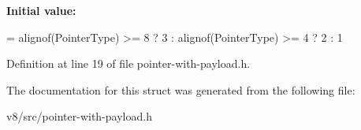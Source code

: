 {\bfseries Initial value\+:}
\begin{DoxyCode}
=
      \textcolor{keyword}{alignof}(PointerType) >= 8 ? 3 : \textcolor{keyword}{alignof}(PointerType) >= 4 ? 2 : 1
\end{DoxyCode}


Definition at line 19 of file pointer-\/with-\/payload.\+h.



The documentation for this struct was generated from the following file\+:\begin{DoxyCompactItemize}
\item 
v8/src/pointer-\/with-\/payload.\+h\end{DoxyCompactItemize}
